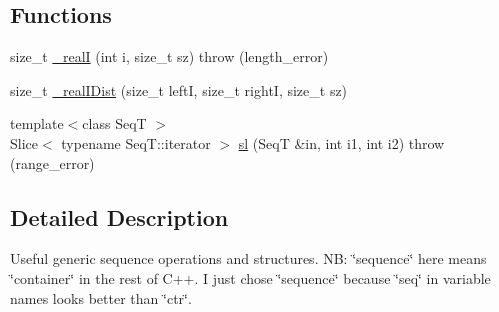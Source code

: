 \subsection*{Functions}
\begin{DoxyCompactItemize}
\item 
size\-\_\-t \hyperlink{namespaceseq_a9f008982bf05fc256d4b035890744c77}{\-\_\-real\-I} (int i, size\-\_\-t sz)  throw (length\-\_\-error)
\item 
size\-\_\-t \hyperlink{namespaceseq_ae4290a190db34f394330d88a5de8f2a7}{\-\_\-real\-I\-Dist} (size\-\_\-t left\-I, size\-\_\-t right\-I, size\-\_\-t sz)
\item 
{\footnotesize template$<$class Seq\-T $>$ }\\Slice$<$ typename Seq\-T\-::iterator $>$ \hyperlink{namespaceseq_a01ecaea35db083541a258a05ac8c1d30}{sl} (Seq\-T \&in, int i1, int i2)  throw (range\-\_\-error)
\end{DoxyCompactItemize}


\subsection{Detailed Description}
Useful generic sequence operations and structures. N\-B\-: \char`\"{}sequence\char`\"{} here means \char`\"{}container\char`\"{} in the rest of C++. I just chose \char`\"{}sequence\char`\"{} because \char`\"{}seq\char`\"{} in variable names looks better than \char`\"{}ctr\char`\"{}. 


